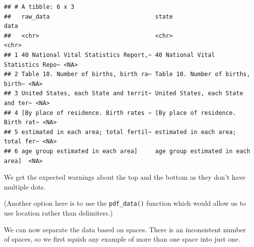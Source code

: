 \documentclass[
]{book}
\newenvironment{Shaded}{\begin{snugshade}}{\end{snugshade}}
\newcommand{\CharTok}[1]{\textcolor[rgb]{0.31,0.60,0.02}{#1}}
\newcommand{\DataTypeTok}[1]{\textcolor[rgb]{0.13,0.29,0.53}{#1}}
\newcommand{\DecValTok}[1]{\textcolor[rgb]{0.00,0.00,0.81}{#1}}
\newcommand{\KeywordTok}[1]{\textcolor[rgb]{0.13,0.29,0.53}{\textbf{#1}}}
\newcommand{\NormalTok}[1]{#1}
\newcommand{\OperatorTok}[1]{\textcolor[rgb]{0.81,0.36,0.00}{\textbf{#1}}}
\newcommand{\OtherTok}[1]{\textcolor[rgb]{0.56,0.35,0.01}{#1}}
\newcommand{\StringTok}[1]{\textcolor[rgb]{0.31,0.60,0.02}{#1}}
\begin{document}
\begin{Shaded}
\end{Shaded}

\begin{verbatim}
## # A tibble: 6 x 3
##   raw_data                              state                              data 
##   <chr>                                 <chr>                              <chr>
## 1 40 National Vital Statistics Report,~ 40 National Vital Statistics Repo~ <NA> 
## 2 Table 10. Number of births, birth ra~ Table 10. Number of births, birth~ <NA> 
## 3 United States, each State and territ~ United States, each State and ter~ <NA> 
## 4 [By place of residence. Birth rates ~ [By place of residence. Birth rat~ <NA> 
## 5 estimated in each area; total fertil~ estimated in each area; total fer~ <NA> 
## 6 age group estimated in each area]     age group estimated in each area]  <NA>
\end{verbatim}

We get the expected warnings about the top and the bottom as they don't have multiple dots.

(Another option here is to use the \texttt{pdf\_data()} function which would allow us to use location rather than delimiters.)

We can now separate the data based on spaces. There is an inconsistent number of spaces, so we first squish any example of more than one space into just one.
\end{document}

